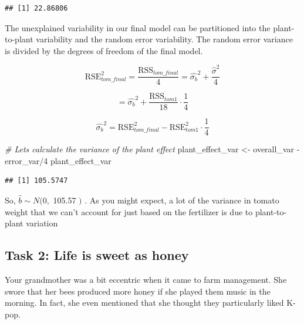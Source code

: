\documentclass[
  openany]{book}
\newenvironment{Shaded}{\begin{snugshade}}{\end{snugshade}}
\newcommand{\CommentTok}[1]{\textcolor[rgb]{0.56,0.35,0.01}{\textit{#1}}}
\newcommand{\DecValTok}[1]{\textcolor[rgb]{0.00,0.00,0.81}{#1}}
\newcommand{\FunctionTok}[1]{\textcolor[rgb]{0.00,0.00,0.00}{#1}}
\newcommand{\NormalTok}[1]{#1}
\newcommand{\OtherTok}[1]{\textcolor[rgb]{0.56,0.35,0.01}{#1}}
\newcommand{\SpecialCharTok}[1]{\textcolor[rgb]{0.00,0.00,0.00}{#1}}
\begin{document}
\begin{Shaded}
\end{Shaded}

\begin{verbatim}
## [1] 22.86806
\end{verbatim}

The unexplained variability in our final model can be partitioned into the plant-to-plant variability and the random error variability. The random error variance is divided by the degrees of freedom of the final model.

\[\text{RSE}_{tom\_final}^2 = \frac{\text{RSS}_{tom\_final}}{4} = \hat{\sigma_b}^2 +  \frac{\hat{\sigma}^2}{4}\]

\[ = \hat{\sigma_b}^2 + \frac{\text{RSS}_{tom1}}{18}\cdot\frac{1}{4}\]

\[\hat{\sigma_b}^2 = \text{RSE}_{tom\_final}^2 - \text{RSE}^2_{tom1} \cdot\frac{1}{4}\]

\begin{Shaded}
\begin{Highlighting}[]
\CommentTok{\# Let\textquotesingle{}s calculate the variance of the plant effect}
\NormalTok{plant\_effect\_var }\OtherTok{\textless{}{-}}\NormalTok{ overall\_var }\SpecialCharTok{{-}}\NormalTok{ error\_var}\SpecialCharTok{/}\DecValTok{4}
\NormalTok{plant\_effect\_var}
\end{Highlighting}
\end{Shaded}

\begin{verbatim}
## [1] 105.5747
\end{verbatim}

So, \(\hat{b} \sim N(0,\) 105.57 \()\) . As you might expect, a lot of the variance in tomato weight that we can't account for just based on the fertilizer is due to plant-to-plant variation

\hypertarget{task-2-life-is-sweet-as-honey}{%
\subsection{Task 2: Life is sweet as honey}\label{task-2-life-is-sweet-as-honey}}

Your grandmother was a bit eccentric when it came to farm management. She swore that her bees produced more honey if she played them music in the morning. In fact, she even mentioned that she thought they particularly liked K-pop.
\end{document}
